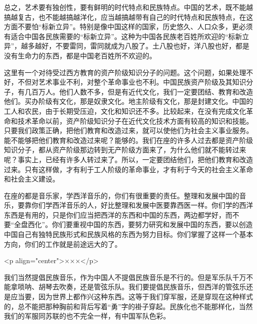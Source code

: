 总之，艺术要有独创性，要有鲜明的时代特点和民族特点。中国的艺术，既不能越搞越复古，也不能越搞越洋化，应当越搞越带有自己的时代特点和民族特点，在这方面不要怕“标新立异”。特别是像中国这样的国家，历史悠久、人口众多，更必须有适合中国各民族需要的“标新立异”。这种为中国各民族老百姓所欢迎的“标新立异”，越多越好，不要雷同，雷同就成为八股了。土八股也好，洋八股也好，都是没有生命力的东西，都是中国老百姓所不欢迎的。

这里有一个对待受过西方教育的资产阶级知识分子的问题。这个问题，如果处理不好，不但对艺术事业不利，对整个革命事业也不利。中国民族资产阶级及其知识分子，有几百万人。他们人数不多，但是有近代文化，我们一定要团结、教育和改造他们。买办阶级有文化，那是奴隶文化。地主阶级有文化，那是封建文化。中国的工人和农民，由于长期受压迫，文化和知识还不多。比较起来，在没有完成文化革命和技术革命以前，资产阶级知识分子在近代文化技术方面有较高的知识和技能。只要我们政策正确，把他们教育和改造过来，就可以使他们为社会主义事业服务。能不能够把他们教育和改造过来呢？能够的。我们在座的许多人过去都是资产阶级知识分子，都从资产阶级那边转到无产阶级方面来了，为什么他们就不能转过来呢？事实上，已经有许多人转过来了。所以，一定要团结他们，把他们教育和改造过来。只有这样做，才有利于工人阶级的革命事业，才有利于今天的社会主义革命和社会主义建设。

在座的都是音乐家，学西洋音乐的，你们有很重要的责任。整理和发展中国的音乐，要靠你们学西洋音乐的人，好比整理和发展中医要靠西医一样。你们学的西洋东西是有用的，只是你们应当把西洋的东西和中国的东西，两边都学好，而不要“全盘西化”。你们要重视中国的东西，要努力研究和发展中国的东西，要以创造中国自己有独特民族形式和民族风格的东西为努力目标。你们掌握了这样一个基本方向，你们的工作就是前途远大的了。

<p align="center">×××</p>

我们当然提倡民族音乐，作为中国人不提倡民族音乐是不行的。但是军乐队千万不能拿唢呐、胡琴去吹奏，还是管弦乐队。我们要提倡民族音乐，但西洋的管弦乐还是应当要，因为世界上都作兴这种东西。这等于我们穿军服，还是穿现在这种样式的，总不能把那种胸前和背后写着“勇”字的褂子穿起。民族化也不能那样化，当然我们的军服同苏联的也不完全一样，有中国军队色彩。


